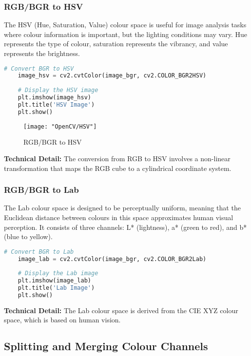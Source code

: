 \subsubsection{RGB/BGR to HSV}

The HSV (Hue, Saturation, Value) colour space is useful for image analysis tasks where colour information is important, but the lighting conditions may vary. Hue represents the type of colour, saturation represents the vibrancy, and value represents the brightness.\cite{Dawson:2014}

\begin{lstlisting}[language=Python, caption=Converting BGR to HSV in OpenCV]
	# Convert BGR to HSV
	image_hsv = cv2.cvtColor(image_bgr, cv2.COLOR_BGR2HSV)
	
	# Display the HSV image
	plt.imshow(image_hsv)
	plt.title('HSV Image')
	plt.show()
\end{lstlisting}

\begin{figure}[h]
	\centering
	\texttt{[image: "OpenCV/HSV"]}
	\caption{RGB/BGR to HSV}\label{HSV Image}
\end{figure}

\textbf{Technical Detail:} The conversion from RGB to HSV involves a non-linear transformation that maps the RGB cube to a cylindrical coordinate system.

\subsubsection{RGB/BGR to Lab}

The Lab colour space is designed to be perceptually uniform, meaning that the Euclidean distance between colours in this space approximates human visual perception. It consists of three channels: L* (lightness), a* (green to red), and b* (blue to yellow).

\begin{lstlisting}[language=Python, caption=Converting BGR to Lab in OpenCV]
	# Convert BGR to Lab
	image_lab = cv2.cvtColor(image_bgr, cv2.COLOR_BGR2Lab)
	
	# Display the Lab image
	plt.imshow(image_lab)
	plt.title('Lab Image')
	plt.show()
\end{lstlisting}

\textbf{Technical Detail:} The Lab colour space is derived from the CIE XYZ colour space, which is based on human vision.

\subsection{Splitting and Merging Colour Channels }

